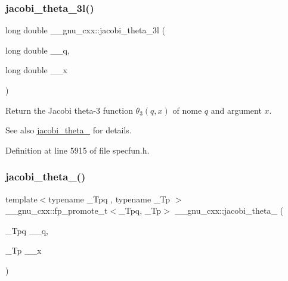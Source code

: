 \subsubsection{\texorpdfstring{jacobi\+\_\+theta\+\_\+3l()}{jacobi\_theta\_3l()}}
{\footnotesize\ttfamily long double \+\_\+\+\_\+gnu\+\_\+cxx\+::jacobi\+\_\+theta\+\_\+3l (\begin{DoxyParamCaption}\item[{long double}]{\+\_\+\+\_\+q,  }\item[{long double}]{\+\_\+\+\_\+x }\end{DoxyParamCaption})\hspace{0.3cm}{\ttfamily [inline]}}

Return the Jacobi theta-\/3 function $ \theta_3(q,x) $ of nome $ q $ and argument $ x $.

\begin{DoxySeeAlso}{See also}
\hyperlink{group__gnu__math__spec__func_gaf4eac2990db1dadba66ae688ceaa6403}{jacobi\+\_\+theta\+\_} for details. 
\end{DoxySeeAlso}


Definition at line 5915 of file specfun.\+h.

\mbox{\label{group__gnu__math__spec__func_ga676501b6284d5702a3dc61252e6c78ab}} 
\subsubsection{\texorpdfstring{jacobi\+\_\+theta\+\_()}{jacobi\_theta\_4()}}
{\footnotesize\ttfamily template$<$typename \+\_\+\+Tpq , typename \+\_\+\+Tp $>$ \\
\+\_\+\+\_\+gnu\+\_\+cxx\+::fp\+\_\+promote\+\_\+t$<$\+\_\+\+Tpq, \+\_\+\+Tp$>$ \+\_\+\+\_\+gnu\+\_\+cxx\+::jacobi\+\_\+theta\+\_ (\begin{DoxyParamCaption}\item[{\+\_\+\+Tpq}]{\+\_\+\+\_\+q,  }\item[{\+\_\+\+Tp}]{\+\_\+\+\_\+x }\end{DoxyParamCaption})\hspace{0.3cm}{\ttfamily [inline]}}

